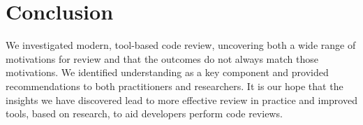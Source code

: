 
\section{Conclusion} \label{sec:conclusion}


We investigated modern, tool-based code review, uncovering both a wide range of motivations for review and that the outcomes do not always match those motivations. We identified understanding as a key component and provided recommendations to both practitioners and researchers. It is our hope that the insights we have discovered lead to more effective review in practice and improved tools, based on research, to aid developers perform code reviews.